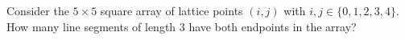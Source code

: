Consider the $5\times5$ square array of lattice points $(i,j)$ with $i,j\in\{0,1,2,3,4\}$. How many line segments of length $3$ have both endpoints in the array?
